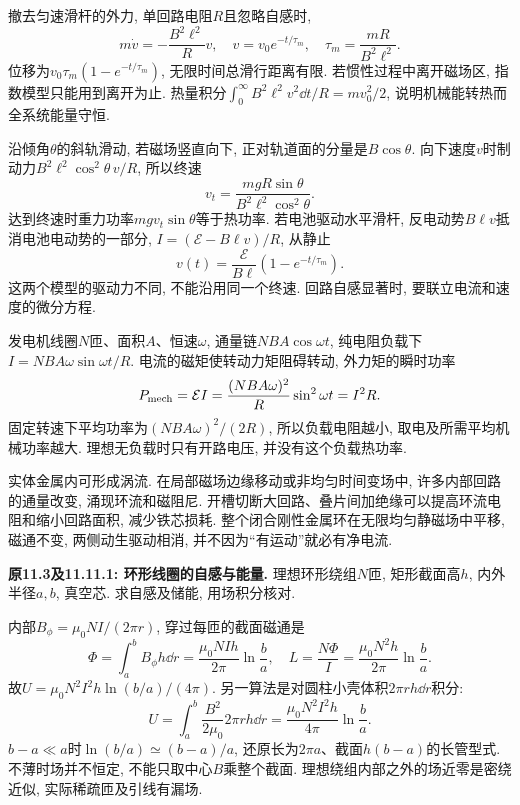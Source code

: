\label{tb:magnetic-braking}
撤去匀速滑杆的外力, 单回路电阻$R$且忽略自感时,
\[m\dot v=-\frac{B^2\ell^2}R v,\quad v=v_0e^{-t/\tau_m},\quad
\tau_m=\frac{mR}{B^2\ell^2}.\]
位移为$v_0\tau_m(1-e^{-t/\tau_m})$, 无限时间总滑行距离有限. 若惯性过程中离开磁场区, 指数模型只能用到离开为止. 热量积分$\int_0^\infty B^2\ell^2v^2\dd t/R=mv_0^2/2$, 说明机械能转热而全系统能量守恒.

沿倾角$\theta$的斜轨滑动, 若磁场竖直向下, 正对轨道面的分量是$B\cos\theta$. 向下速度$v$时制动力$B^2\ell^2\cos^2\theta\,v/R$, 所以终速
\[v_t=\frac{mgR\sin\theta}{B^2\ell^2\cos^2\theta}.\]
达到终速时重力功率$mgv_t\sin\theta$等于热功率. 若电池驱动水平滑杆, 反电动势$B\ell v$抵消电池电动势的一部分, $I=(\mathcal E-B\ell v)/R$, 从静止
\[v(t)=\frac{\mathcal E}{B\ell}(1-e^{-t/\tau_m}).\]
这两个模型的驱动力不同, 不能沿用同一个终速. 回路自感显著时, 要联立电流和速度的微分方程.

发电机线圈$N$匝、面积$A$、恒速$\omega$, 通量链$NBA\cos\omega t$, 纯电阻负载下$I=NBA\omega\sin\omega t/R$. 电流的磁矩使转动力矩阻碍转动, 外力矩的瞬时功率
\[P_{\rm mech}=\mathcal EI=\frac{(NBA\omega)^2}{R}\sin^2\omega t=I^2R.\]
固定转速下平均功率为$(NBA\omega)^2/(2R)$, 所以负载电阻越小, 取电及所需平均机械功率越大. 理想无负载时只有开路电压, 并没有这个负载热功率.

实体金属内可形成涡流. 在局部磁场边缘移动或非均匀时间变场中, 许多内部回路的通量改变, 涌现环流和磁阻尼. 开槽切断大回路、叠片间加绝缘可以提高环流电阻和缩小回路面积, 减少铁芯损耗. 整个闭合刚性金属环在无限均匀静磁场中平移, 磁通不变, 两侧动生驱动相消, 并不因为“有运动”就必有净电流.

\label{tb:toroid-l}
\begin{example}
\textbf{原11.3及11.11.1: 环形线圈的自感与能量.} 
理想环形绕组$N$匝, 矩形截面高$h$, 内外半径$a,b$, 真空芯. 求自感及储能, 用场积分核对.
\end{example}
\begin{solution}
内部$B_\phi=\mu_0NI/(2\pi r)$, 穿过每匝的截面磁通是
\[\Phi=\int_a^bB_\phi h\dd r=\frac{\mu_0NIh}{2\pi}\ln\frac ba,
\quad L=\frac{N\Phi}I=\frac{\mu_0N^2h}{2\pi}\ln\frac ba.\]
故$U=\mu_0N^2I^2h\ln(b/a)/(4\pi)$. 另一算法是对圆柱小壳体积$2\pi rh\dd r$积分:
\[U=\int_a^b\frac{B^2}{2\mu_0}2\pi rh\dd r=\frac{\mu_0N^2I^2h}{4\pi}\ln\frac ba.\]
$b-a\ll a$时$\ln(b/a)\simeq(b-a)/a$, 还原长为$2\pi a$、截面$h(b-a)$的长管型式. 不薄时场并不恒定, 不能只取中心$B$乘整个截面. 理想绕组内部之外的场近零是密绕近似, 实际稀疏匝及引线有漏场.
\end{solution}

